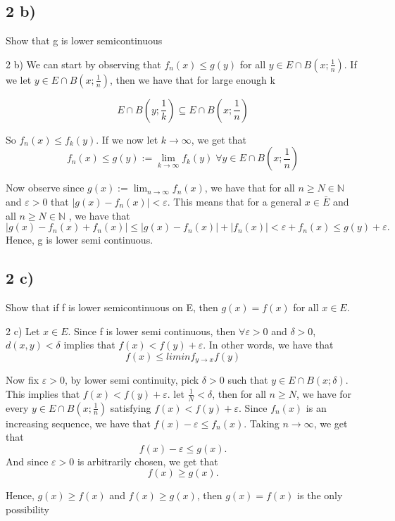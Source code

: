\documentclass[a4paper,norsk]{article}
\renewcommand{\geq}{\geqslant}
\renewcommand{\leq}{\leqslant}
\renewcommand{\epsilon}{\varepsilon}
\begin{document}
\subsection*{2 b)}

Show that g is lower semicontinuous

\begin{proofbox}{2 b)}{}
  We can start by observing that $ f_n(x) \leq g(y)  $ for all $ y \in  E \cap B \left( x; \frac{ 1 }{ n } \right)  $. If we let $ y \in E \cap B \left( x; \frac{ 1 }{ n } \right)  $, then we have that for large enough k

\[
    E \cap B \left( y ; \frac{ 1 }{ k } \right) \subseteq E \cap B \left( x; \frac{ 1 }{ n } \right)
\]

So $ f_n(x) \leq f_k(y) $. If we now let $ k \to \infty $, we get that 
\[
    f_n(x) \leq g(y) := \lim_{k \to \infty}  f_k(y) \; \forall  y \in E \cap B \left( x; \frac{ 1 }{ n } \right) 
\]


Now observe since $ g(x) := \lim_{n \to \infty} f_n(x)  $, we have that for all $ n \geq N \in \mathbb{N} $ and $ \epsilon > 0 $ that $ \left| g(x) - f_n(x) \right| < \epsilon  $. This means that for a general $ x \in \bar{E} $ and all $ n \geq N \in \mathbb{N} $ , we have that
\[
    \left| g(x) - f_n(x) + f_n(x) \right| \leq \left| g(x) - f_n(x)  \right| + \left| f_n(x) \right| < \epsilon + f_n(x) \leq g(y) + \epsilon.
\]
Hence, g is lower semi continuous.
\end{proofbox}

\subsection*{2 c)}

Show that if f is lower semicontinuous on E, then $ g(x) = f(x)  $ for all $ x \in E $.

\begin{proofbox}{2 c)}{}
  Let $ x \in E $. Since f is lower semi continuous, then $ \forall \epsilon > 0 $ and $ \delta > 0 $, $ d \left( x, y \right) < \delta  $ implies that $ f(x) < f(y) + \epsilon  $. In other words, we have that 
  \[
      f(x) \leq  liminf_{y \to x} f(y)
  \]

  Now fix $ \epsilon > 0 $, by lower semi continuity, pick $ \delta > 0 $ such that $ y \in E \cap B \left( x; \delta  \right)  $. This implies that $ f(x) < f(y) + \epsilon  $. let $ \frac{ 1 }{ N } < \delta  $, then for all $ n \geq N $, we have for every $ y \in E \cap B \left( x; \frac{ 1 }{ n } \right)  $ satisfying $ f(x) < f(y) + \epsilon  $. Since $ f_n(x) $ is an increasing sequence, we have that $ f(x) - \epsilon  \leq f_n(x) $. Taking $ n \to \infty $, we get that 
  \[
      f(x) - \epsilon  \leq g(x).
  \]
  And since $ \epsilon >0 $ is arbitrarily chosen, we get that 
  \[
      f(x) \geq  g(x).
  \]
  
  Hence, $ g(x) \geq f(x)  $ and $ f(x) \geq g(x) $, then $ g(x) = f(x) $ is the only possibility
\end{proofbox}
\end{document}
